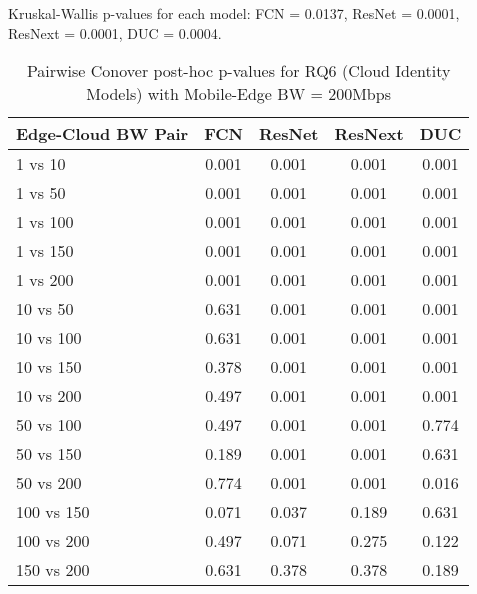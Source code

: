 \begin{table}[h]
\centering
\caption{Pairwise Conover post-hoc p-values for RQ6 (Cloud Identity Models) with Mobile-Edge BW = 200Mbps}
\label{tab:conover_cloud_identity_me200}
\smallskip
Kruskal-Wallis p-values for each model: FCN = 0.0137, ResNet = 0.0001, ResNext = 0.0001, DUC = 0.0004.

\begin{tabular}{lcccc}
\toprule
Edge-Cloud BW Pair & FCN & ResNet & ResNext & DUC \\
\midrule
1 vs 10 & 0.001 & 0.001 & 0.001 & 0.001 \\
1 vs 50 & 0.001 & 0.001 & 0.001 & 0.001 \\
1 vs 100 & 0.001 & 0.001 & 0.001 & 0.001 \\
1 vs 150 & 0.001 & 0.001 & 0.001 & 0.001 \\
1 vs 200 & 0.001 & 0.001 & 0.001 & 0.001 \\
10 vs 50 & 0.631 & 0.001 & 0.001 & 0.001 \\
10 vs 100 & 0.631 & 0.001 & 0.001 & 0.001 \\
10 vs 150 & 0.378 & 0.001 & 0.001 & 0.001 \\
10 vs 200 & 0.497 & 0.001 & 0.001 & 0.001 \\
50 vs 100 & 0.497 & 0.001 & 0.001 & 0.774 \\
50 vs 150 & 0.189 & 0.001 & 0.001 & 0.631 \\
50 vs 200 & 0.774 & 0.001 & 0.001 & 0.016 \\
100 vs 150 & 0.071 & 0.037 & 0.189 & 0.631 \\
100 vs 200 & 0.497 & 0.071 & 0.275 & 0.122 \\
150 vs 200 & 0.631 & 0.378 & 0.378 & 0.189 \\
\bottomrule
\end{tabular}
\end{table}

